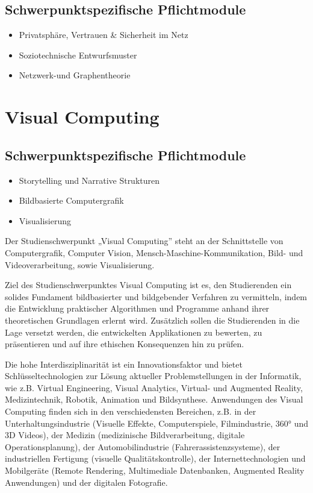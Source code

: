 \section*{Schwerpunktspezifische
Pflichtmodule}\label{schwerpunktspezifische-pflichtmodule-2}

\begin{itemize}
\item
  Privatsphäre, Vertrauen \& Sicherheit im Netz
\item
  Soziotechnische Entwurfsmuster
\item
  Netzwerk-und Graphentheorie
\end{itemize}

\chapter{Visual Computing}\label{visual-computing}

\section*{Schwerpunktspezifische
Pflichtmodule}\label{schwerpunktspezifische-pflichtmodule-3}

\begin{itemize}
\item
  Storytelling und Narrative Strukturen
\item
  Bildbasierte Computergrafik
\item
  Visualisierung
\end{itemize}

Der Studienschwerpunkt „Visual Computing'' steht an der Schnittstelle
von Computergrafik, Computer Vision, Mensch-Maschine-Kommunikation,
Bild- und Videoverarbeitung, sowie Visualisierung.

Ziel des Studienschwerpunktes Visual Computing ist es, den Studierenden
ein solides Fundament bildbasierter und bildgebender Verfahren zu
vermitteln, indem die Entwicklung praktischer Algorithmen und Programme
anhand ihrer theoretischen Grundlagen erlernt wird. Zusätzlich sollen
die Studierenden in die Lage versetzt werden, die entwickelten
Applikationen zu bewerten, zu präsentieren und auf ihre ethischen
Konsequenzen hin zu prüfen.

Die hohe Interdisziplinarität ist ein Innovationsfaktor und bietet
Schlüsseltechnologien zur Lösung aktueller Problemstellungen in der
Informatik, wie z.B. Virtual Engineering, Visual Analytics, Virtual- und
Augmented Reality, Medizintechnik, Robotik, Animation und Bildsynthese.
Anwendungen des Visual Computing finden sich in den verschiedensten
Bereichen, z.B. in der Unterhaltungsindustrie (Visuelle Effekte,
Computerspiele, Filmindustrie, 360° und 3D Videos), der Medizin
(medizinische Bildverarbeitung, digitale Operationsplanung), der
Automobilindustrie (Fahrerassistenzsysteme), der industriellen Fertigung
(visuelle Qualitätskontrolle), der Internettechnologien und Mobilgeräte
(Remote Rendering, Multimediale Datenbanken, Augmented Reality
Anwendungen) und der digitalen Fotografie.

